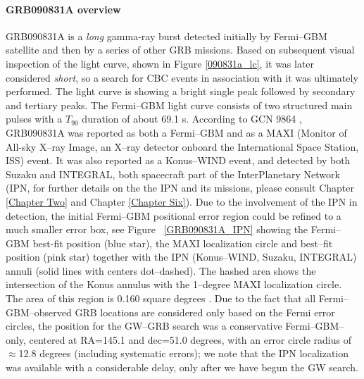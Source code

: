 \paragraph{GRB090831A overview}
GRB090831A is a \emph{long} gamma-ray burst detected initially by Fermi--GBM satellite and then by a series of other GRB missions. Based on subsequent visual inspection of the light curve, shown in Figure \ref{090831a_lc}, it was later considered \emph{short}, so a search for CBC events in association with it was ultimately performed. The light curve is showing a bright single peak followed by secondary and tertiary peaks. The Fermi--GBM light curve consists of two structured main pulses with a $T_{90}$ duration of about 69.1 s. According to GCN 9864 \cite{gcn9864}, GRB090831A was reported as both a Fermi--GBM and as a MAXI (Monitor of All-sky X--ray Image, an X--ray detector onboard the International Space Station, ISS) event. It was also reported as a Konus--WIND event, and detected by both Suzaku and INTEGRAL, both spacecraft part of the InterPlanetary Network (IPN, for further details on the the IPN and its missions, please consult Chapter \ref{Chapter Two} and Chapter \ref{Chapter Six}). Due to the involvement of the IPN in detection, the initial Fermi--GBM positional error region could be refined to a much smaller error box, see Figure ~\ref{GRB090831A_IPN} showing the Fermi--GBM best-fit position (blue star), the MAXI localization circle and best--fit position (pink star) together with the IPN (Konus--WIND, Suzaku, INTEGRAL) annuli (solid lines with centers dot--dashed). The hashed area shows the intersection of the Konus annulus with the 1--degree MAXI localization circle. The area of this region is 0.160 square degrees \cite{gcn9864}. Due to the fact that all Fermi--GBM--observed GRB locations are considered only based on the Fermi error circles, the position for the GW--GRB search was a conservative Fermi--GBM--only, centered at RA=145.1 and dec=51.0 degrees, with an error circle radius of $\approx$12.8 degrees (including systematic errors); we note that the IPN localization was available with a considerable delay, only after we have begun the GW search.

